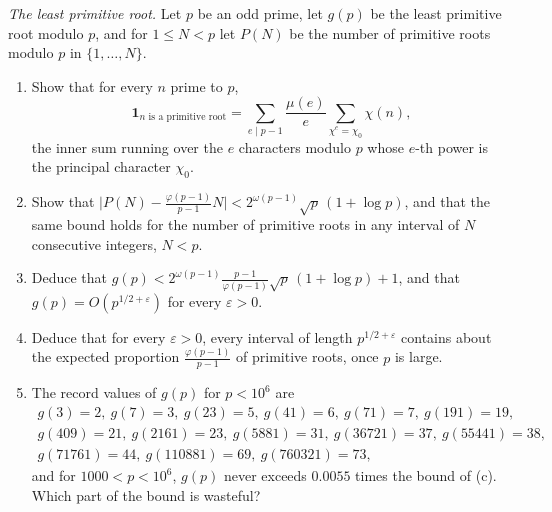 \begin{exercise}[Journey]\label{pb:primroot}
\emph{The least primitive root.} Let $p$ be an odd prime, let $g(p)$ be the least primitive root modulo $p$, and for $1\le N<p$ let $P(N)$ be the number of primitive
roots modulo $p$ in $\{1,\dots,N\}$.
\begin{enumerate}[label=(\alph*)]
\item Show that for every $n$ prime to $p$,
\[
\mathbf 1_{\text{$n$ is a primitive root}}=\sum_{e\mid p-1}\frac{\mu(e)}e\sum_{\chi^e=\chi_0}\chi(n),
\]
the inner sum running over the $e$ characters modulo $p$ whose $e$-th power is the principal character $\chi_0$.
\item Show that $\bigl|P(N)-\frac{\varphi(p-1)}{p-1}N\bigr|<2^{\omega(p-1)}\sqrt p\,(1+\log p)$, and that the same bound holds for the number of primitive roots in any
interval of $N$ consecutive integers, $N<p$.
\item Deduce that $g(p)<2^{\omega(p-1)}\frac{p-1}{\varphi(p-1)}\sqrt p\,(1+\log p)+1$, and that $g(p)=O(p^{1/2+\varepsilon})$ for every $\varepsilon>0$.
\item Deduce that for every $\varepsilon>0$, every interval of length $p^{1/2+\varepsilon}$ contains about the expected proportion $\frac{\varphi(p-1)}{p-1}$ of
primitive roots, once $p$ is large.
\item The record values of $g(p)$ for $p<10^6$ are
\[
\begin{gathered}
g(3)=2,\ g(7)=3,\ g(23)=5,\ g(41)=6,\ g(71)=7,\ g(191)=19,\\
g(409)=21,\ g(2161)=23,\ g(5881)=31,\ g(36721)=37,\ g(55441)=38,\\
g(71761)=44,\ g(110881)=69,\ g(760321)=73,
\end{gathered}
\]
and for $1000<p<10^6$, $g(p)$ never exceeds $0.0055$ times the bound of (c). Which part of the bound is wasteful?
\end{enumerate}
\end{exercise}

